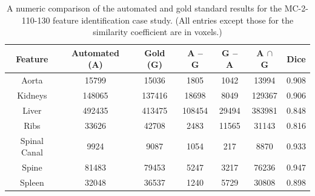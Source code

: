 \begin{table}[p]
\begin{center}
\begin{tabular}{c|cccccc}
\footnotesize \textbf{Feature} & \footnotesize \textbf{Automated (A)} & \footnotesize \textbf{Gold (G)} & \footnotesize \textbf{A -- G} & \footnotesize \textbf{G -- A} & \footnotesize \textbf{A $\cap$ G} & \footnotesize \textbf{Dice} \\
\hline
\footnotesize Aorta & \footnotesize 15799 & \footnotesize 15036 & \footnotesize 1805 & \footnotesize 1042 & \footnotesize 13994 & \footnotesize 0.908 \\
\footnotesize Kidneys & \footnotesize 148065 & \footnotesize 137416 & \footnotesize 18698 & \footnotesize 8049 & \footnotesize 129367 & \footnotesize 0.906 \\
\footnotesize Liver & \footnotesize 492435 & \footnotesize 413475 & \footnotesize 108454 & \footnotesize 29494 & \footnotesize 383981 & \footnotesize 0.848 \\
\footnotesize Ribs & \footnotesize 33626 & \footnotesize 42708 & \footnotesize 2483 & \footnotesize 11565 & \footnotesize 31143 & \footnotesize 0.816 \\
\footnotesize Spinal Canal & \footnotesize 9924 & \footnotesize 9087 & \footnotesize 1054 & \footnotesize 217 & \footnotesize 8870 & \footnotesize 0.933 \\
\footnotesize Spine & \footnotesize 81483 & \footnotesize 79453 & \footnotesize 5247 & \footnotesize 3217 & \footnotesize 76236 & \footnotesize 0.947 \\
\footnotesize Spleen & \footnotesize 32048 & \footnotesize 36537 & \footnotesize 1240 & \footnotesize 5729 & \footnotesize 30808 & \footnotesize 0.898 \\
\end{tabular}
\end{center}
\caption{A numeric comparison of the automated and gold standard results for the MC-2-110-130 feature identification case study. (All entries except those for the similarity coefficient are in voxels.)}
\label{tbl:validation-MC-2-110-130}
\end{table}


